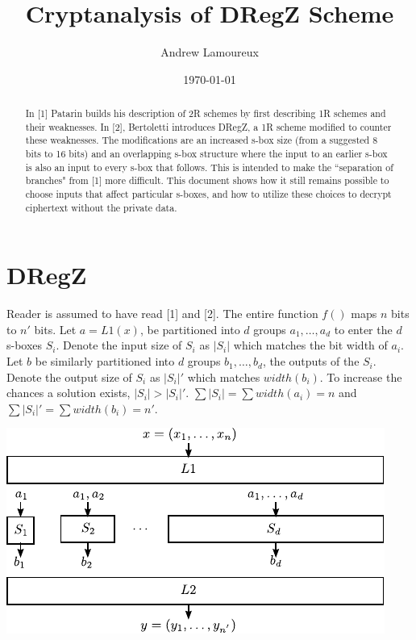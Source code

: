 \documentclass{article}
\begin{document}
\title{Cryptanalysis of DRegZ Scheme}
\date{\today{}}
\author{Andrew Lamoureux}
\maketitle

\begin{abstract}
In [1] Patarin builds his description of 2R schemes by first describing 1R schemes and their weaknesses. In [2], Bertoletti introduces DRegZ, a 1R scheme modified
to counter these weaknesses. The modifications are an increased s-box size (from a suggested 8 bits to 16 bits) and an overlapping s-box structure where the input
to an earlier s-box is also an input to every s-box that follows. This is intended to make the ``separation of branches" from [1] more difficult. This document shows how it
still remains possible to choose inputs that affect particular s-boxes, and how to utilize these choices to decrypt ciphertext without the private data.

\end{abstract}

\section{DRegZ}
Reader is assumed to have read [1] and [2]. The entire function $f()$ maps $n$ bits to $n'$ bits.
Let $a = L1(x)$, be partitioned into $d$ groups $a_1, \ldots ,a_d$ to enter the $d$ s-boxes $S_i$. Denote the input size of $S_i$ as $|S_i|$ which matches the bit width of $a_i$. 
Let $b$ be similarly partitioned into $d$ groups $b_1, \ldots ,b_d$, the outputs of the $S_i$. Denote the output size of $S_i$ as $|S_i|'$ which matches $width(b_i)$.
To increase the chances a solution exists, $|S_i| > |S_i|'$.
$\sum{|S_i|} = \sum{width(a_i)} = n$ and $\sum{|S_i|'} = \sum{width(b_i)} = n'$. 

\begin{center}
\includegraphics{image1.pdf}
\end{center}
\end{document}
